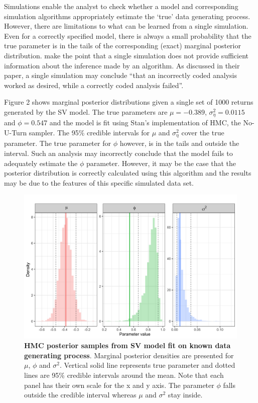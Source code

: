 \documentclass[12pt, a4paper]{article}
\begin{document}
    Simulations enable the analyst to check whether a model and corresponding simulation algorithms appropriately estimate the `true' data generating process. However, there are limitations to what can be learned from a single simulation. Even for a correctly specified model, there is always a small probability that the true parameter is in the tails of the corresponding (exact) marginal posterior distribution. \cite{talts2020validating} make the point that a single simulation does not provide sufficient information about the inference made by an algorithm. As discussed in their paper, a single simulation may conclude ``that an incorrectly coded analysis worked as desired, while a correctly coded analysis failed''. 

    Figure 2 shows marginal posterior distributions given a single set of 1000 returns generated by the SV model. The true parameters are $\mu=-0.389$, $\sigma^2_{\eta}=0.0115$ and $\phi=0.547$ and the model is fit using Stan's implementation of HMC, the No-U-Turn sampler. The 95\% credible intervals for $\mu$ and $\sigma^2_{\eta}$ cover the true parameter. The true parameter for $\phi$ however, is in the tails and outside the interval. Such an analysis may incorrectly conclude that the model fails to adequately estimate the $\phi$ parameter. However, it may be the case that the posterior distribution is correctly calculated using this algorithm and the results may be due to the features of this specific simulated data set.

    \begin{figure}[h]
        \centering
        \includegraphics[scale=0.1]{motivating_example/single_sim.png}
        \caption{\textbf{HMC posterior samples from SV model fit on known data generating process}. Marginal posterior densities are presented for $\mu$, $\phi$ and $\sigma^2$. Vertical solid line represents true parameter and dotted lines are 95\% credible intervals around the mean. Note that each panel has their own scale for the x and y axis. The parameter $\phi$ falls outside the credible interval whereas $\mu$ and $\sigma^2$ stay inside.}
    \end{figure}
\end{document}
